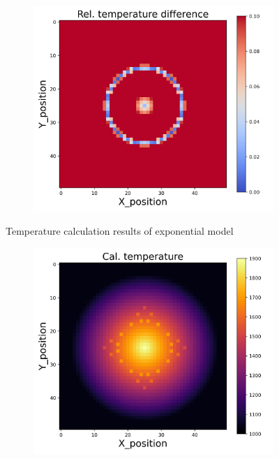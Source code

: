{\begin{figure}[h]
\begin{minipage}{\textwidth}
\begin{subfigure}{0.27\textwidth}
        \end{subfigure}
        \begin{subfigure}{0.27\textwidth}
            \centering
            \includegraphics[width=\textwidth]{figures/raw_data/33/exp/T_bias.jpg}
        \end{subfigure}
    \end{minipage}
    \caption{Temperature calculation results of exponential model}  
\end{figure}
\begin{figure}[p]
    \centering
    \begin{minipage}{\textwidth}
        \centering
        \begin{subfigure}{0.325\textwidth}
            \centering
            \includegraphics[width=\textwidth]{figures/raw_data/0/exp/T_cal.jpg}

\end{subfigure}
\end{minipage}
\end{figure}}
